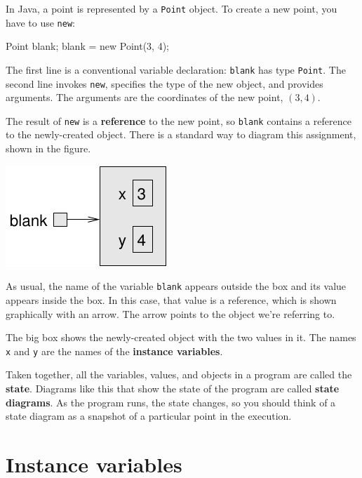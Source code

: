 
In Java, a point is represented by a {\tt Point} object.  To
create a new point, you have to use {\tt new}:

\begin{code}
    Point blank;
    blank = new Point(3, 4);
\end{code}

The first line is a conventional variable declaration: {\tt blank}
has type {\tt Point}.  The second line invokes {\tt new}, specifies
the type of the new object, and provides arguments.  The arguments are
the coordinates of the new point, $(3, 4)$.


The result of {\tt new} is a {\bf reference} to the new
point, so {\tt blank} contains a reference to the
newly-created object.  There is a standard way to diagram this
assignment, shown in the figure.


\includegraphics{figs/reference.pdf}


As usual, the name of the variable {\tt blank} appears outside the box
and its value appears inside the box.  In this case, that value is a
reference, which is shown graphically with an arrow.  The
arrow points to the object we're referring to.

The big box shows the newly-created object with the two values
in it.  The names {\tt x} and {\tt y} are the names of the {\bf
instance variables}.

Taken together, all the variables, values, and objects in a
program are called the {\bf state}.  Diagrams like this that
show the state of the program are called {\bf state diagrams}.
As the program runs, the state changes, so you should think
of a state diagram as a snapshot of a particular point in the
execution.


\section{Instance variables}

